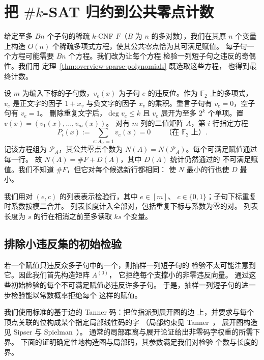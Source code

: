 \section{把 \texorpdfstring{$\#k$-SAT}{\#k-SAT} 归约到公共零点计数}\label{sec:hashes}\label{subsec:sparse-hashes}
给定至多 $Bn$ 个子句的稀疏 $k$-CNF $F$（$B$ 为 $n$
的多对数），我们在其原 $n$ 个变量上构造 $O(n)$
个稀疏多项式方程，使其公共零点恰为其可满足赋值。
每子句一个方程可能需要 $Bn$ 个方程。我们改为让每个方程
检验一列短子句之违反的奇偶性。我们用
定理~\ref{thm:overview-sparse-polynomials} 既选取这些方程，
也得到最终计数。

设 $m$ 为编入下标的子句数，$v_e(x)$ 为子句 $e$
的违反位。作为 $\mathbb F_2$ 上的多项式，
$v_e$ 是正文字的因子 $1+x_v$ 与负文字的因子 $x_v$
的乘积。重言子句有 $v_e=0$，空子句有 $v_e=1$。
删除重复文字后，$\deg v_e\le k$ 且 $v_e$
展开为至多 $2^k$ 个单项。置 $v(x)=(v_1(x),\ldots,v_m(x))$。
对有 $m$ 列的二值矩阵 $A$，第 $i$ 行指定方程
\begin{equation}\label{eq:hash-query}
 P_i(x):=\sum_{e:A_{ie}=1} v_e(x)=0\qquad\text{（在 }\mathbb F_2\text{ 上）}.
\end{equation}
记该方程组为 $\mathcal P_A$，其公共零点个数为
$N(A)=N(\mathcal P_A)$。每个可满足赋值通过每一行。
故 $N(A)=\#F+D(A)$，其中 $D(A)$ 统计仍然通过的
不可满足赋值。我们不知道 $\#F$，但它对每个候选新行都相同：
使 $N$ 最小的行也使 $D$ 最小。

我们用对 $(e,c)$ 的列表表示检验行，其中 $e\in[m]$、
$c\in\{0,1\}$；子句下标重复时系数按模二合并。
列表长度计入全部对，包括重复下标与系数为零的对。
列表长度为 $s$ 的行在相消之前至多读取 $ks$ 个变量。

\subsection{排除小违反集的初始检验}

若一个赋值只违反众多子句中的一个，则抽样一列短子句的
检验不太可能注意到它。因此我们首先构造矩阵 $A^{(0)}$，
它拒绝每个支撑小的非零违反向量。
通过这些初始检验的每个不可满足赋值必违反许多子句。
于是，抽样一列短子句的进一步检验能以常数概率拒绝每个
这样的赋值。

我们使用标准的基于边的 Tanner 码：把位指派到展开图的边
上，并要求与每个顶点关联的位构成某个指定局部线性码的字
（局部约束见 Tanner~\cite[Section~II]{Tanner81}，
展开图构造见 Sipser 与 Spielman~\cite[Sections~IV and~VI]{SS96}）。
通常的局部距离与展开论证给出非零码字权重的所需下界。
下面的证明确定性地构造图与局部码，其参数满足我们对检验
个数与长度的界。

